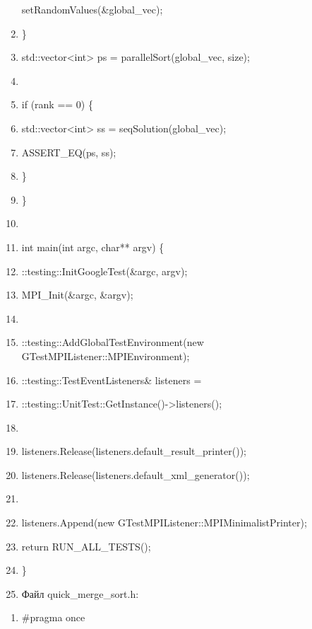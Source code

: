 \documentclass[]{article}
\begin{document}
\begin{enumerate}
  setRandomValues(\&global\_vec);
\item
  \}
\item
  std::vector\textless{}int\textgreater{} ps = parallelSort(global\_vec,
  size);
\item
\item
  if (rank == 0) \{
\item
  std::vector\textless{}int\textgreater{} ss = seqSolution(global\_vec);
\item
  ASSERT\_EQ(ps, ss);
\item
  \}
\item
  \}
\item
\item
  int main(int argc, char** argv) \{
\item
  ::testing::InitGoogleTest(\&argc, argv);
\item
  MPI\_Init(\&argc, \&argv);
\item
\item
  ::testing::AddGlobalTestEnvironment(new
  GTestMPIListener::MPIEnvironment);
\item
  ::testing::TestEventListeners\& listeners =
\item
  ::testing::UnitTest::GetInstance()-\textgreater{}listeners();
\item
\item
  listeners.Release(listeners.default\_result\_printer());
\item
  listeners.Release(listeners.default\_xml\_generator());
\item
\item
  listeners.Append(new GTestMPIListener::MPIMinimalistPrinter);
\item
  return RUN\_ALL\_TESTS();
\item
  \}
\item
  Файл quick\_merge\_sort.h:
\end{enumerate}

\begin{enumerate}
\def\labelenumi{\arabic{enumi}.}
\item
  \#pragma once
\end{enumerate}
\end{document}
